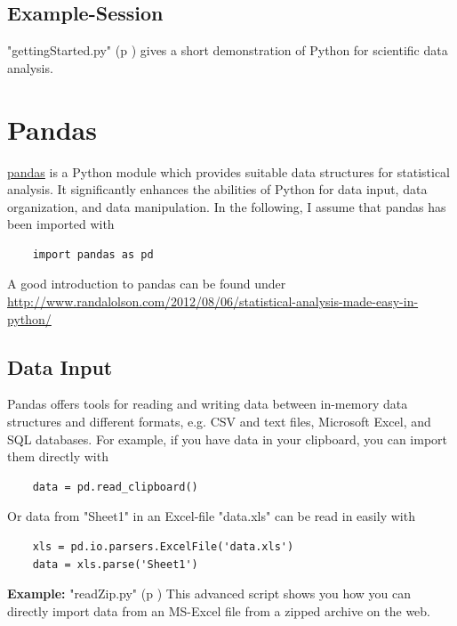 \subsection{Example-Session}

\PyImg "gettingStarted.py" (p \pageref{py:gettingStarted_ipy}) gives a short demonstration of Python for scientific data analysis.


\section{Pandas}

\href{http://pandas.pydata.org/.}{pandas} is a Python module which provides suitable data structures for
statistical analysis. It significantly enhances the abilities of Python for
data input, data organization, and data manipulation. In the following, I assume
that pandas has been imported with

\begin{lstlisting}
    import pandas as pd
\end{lstlisting}

A good introduction to pandas can be found under
\url{http://www.randalolson.com/2012/08/06/statistical-analysis-made-easy-in-python/}

\subsection{Data Input}

Pandas offers tools for reading and writing data between in-memory data structures and different
formats, e.g. CSV and text files, Microsoft Excel, and SQL databases. For example, if you have data
in your clipboard, you can import them directly with

\begin{lstlisting}
    data = pd.read_clipboard()
\end{lstlisting}

Or data from "Sheet1" in an Excel-file "data.xls" can be read in easily with

\begin{lstlisting}
    xls = pd.io.parsers.ExcelFile('data.xls')
    data = xls.parse('Sheet1')
\end{lstlisting}

\textbf{Example: }
\PyImg "readZip.py" (p \pageref{py:readZip}) This advanced script shows you how you can directly import data from an MS-Excel file from a zipped archive on the web.

